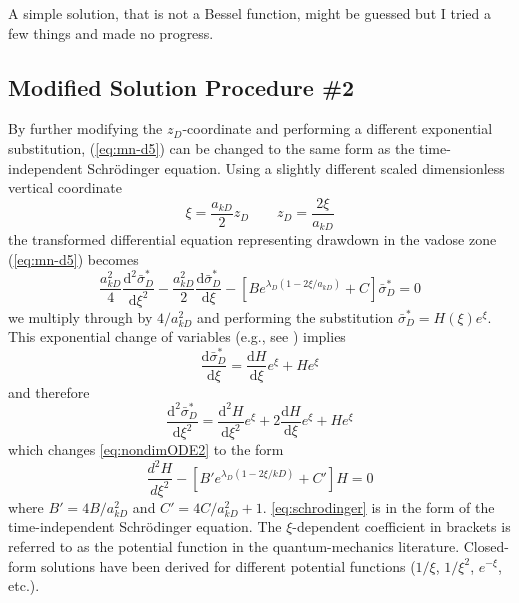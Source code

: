\documentclass[12pt,letterpaper]{article}
\begin{document}
A simple solution, that is not a Bessel function, might be guessed but
I tried a few things and made no progress.

\subsection{Modified Solution Procedure \#2}
By further modifying the $z_D$-coordinate and performing a different
exponential substitution, (\ref{eq:mn-d5}) can be changed to the same
form as the time-independent Schr\"{o}dinger equation.  Using a
slightly different scaled dimensionless vertical coordinate
\begin{equation}\nonumber
 \xi= \frac{a_{kD}}{2} z_D \qquad z_D=\frac{2\xi}{a_{kD}}
\end{equation}
the transformed differential equation representing drawdown in the
vadose zone (\ref{eq:mn-d5}) becomes
\begin{equation}
  \label{eq:nondimODE2}
  \frac{a_{kD}^2}{4} \frac{\mathrm{d}^2
    \bar{\sigma}_D^{\ast}}{\mathrm{d}\xi^2} - \frac{a_{kD}^2}{2}
  \frac{\mathrm{d} \bar{\sigma}_D^{\ast}}{\mathrm{d}\xi} - \left[
    B e^{\lambda_D (1-2\xi/a_{kD})} + C\right] \bar{\sigma}_D^{\ast}=0
\end{equation}
we multiply through by $4/a_{kD}^2$ and performing the substitution
$\bar{\sigma}^{\ast}_{D} = H(\xi) e^\xi$.  This exponential change of
variables (e.g., see \cite{kuhlman2008quasilinear}) implies
\begin{equation}
  \nonumber
  \frac{\mathrm{d} \bar{\sigma}^{\ast}_{D}}{\mathrm{d} \xi} = \frac{\mathrm{d}H}{\mathrm{d}\xi} e^\xi + H e^\xi
\end{equation}
and therefore
\begin{equation}
  \nonumber
  \frac{\mathrm{d}^2 \bar{\sigma}^{\ast}_{D}}{\mathrm{d} \xi^2} = \frac{\mathrm{d}^2H}{\mathrm{d}\xi^2} e^\xi + 2\frac{\mathrm{d}H}{\mathrm{d}\xi} e^\xi + He^\xi
\end{equation}
which changes \eqref{eq:nondimODE2} to the form
\begin{equation}
  \label{eq:schrodinger}
  \frac{d^2 H}{d \xi^2} - \left[B' e^{\lambda_D (1-2\xi/{kD})} + C' \right]H = 0
\end{equation}
where $B' = 4B/a_{kD}^2$ and $C'=4C/a_{kD}^2 + 1$.
\eqref{eq:schrodinger} is in the form of the time-independent
Schr\"{o}dinger equation.  The $\xi$-dependent coefficient in brackets
is referred to as the potential function in the quantum-mechanics
literature.  Closed-form solutions have been derived for different
potential functions ($1/\xi$, $1/\xi^2$, $e^{-\xi}$, etc.).
\end{document}
